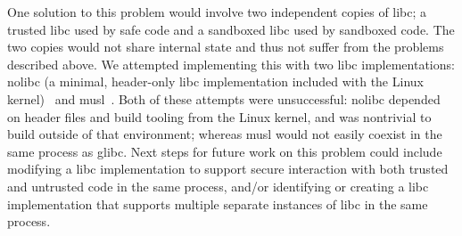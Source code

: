 One solution to this problem would involve two independent copies of libc; a trusted libc used by
safe code and a sandboxed libc used by sandboxed code. The two copies would not share internal state
and thus not suffer from the problems described above. We attempted implementing this with two libc
implementations: nolibc (a minimal, header-only libc implementation included with the Linux
kernel)~\cite{lwn:nolibc} and musl~\cite{musl}. Both of these attempts were unsuccessful: nolibc
depended on header files and build tooling from the Linux kernel, and was nontrivial to build
outside of that environment; whereas musl would not easily coexist in the same process as glibc.
Next steps for future work on this problem could include modifying a libc implementation to support
secure interaction with both trusted and untrusted code in the same process, and/or identifying or
creating a libc implementation that supports multiple separate instances of libc in the same
process.
